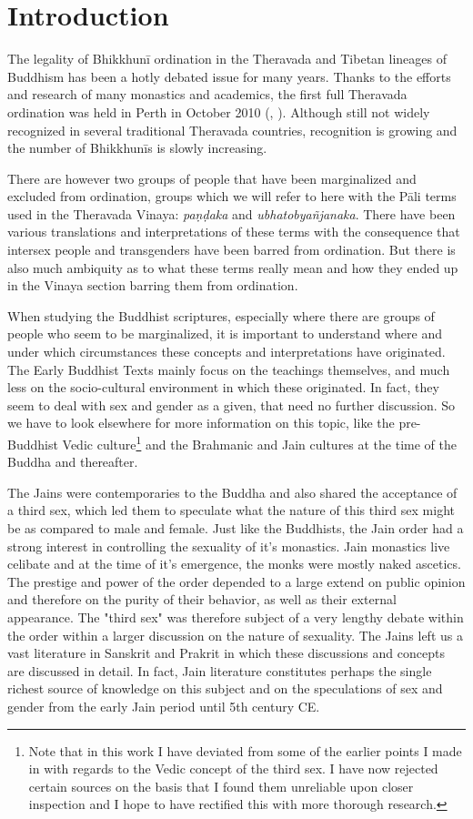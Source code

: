 \section{Introduction}
The legality of Bhikkhunī ordination in the Theravada and Tibetan lineages of Buddhism has been a hotly debated issue for many years. Thanks to the efforts and research of many monastics and academics, the first full Theravada ordination was held in Perth in October 2010 (\cite{sujato2009}, \cite{analayo2013}). Although still not widely recognized in several traditional Theravada countries, recognition is growing and the number of Bhikkhunīs is slowly increasing. 

There are however two groups of people that have been marginalized and excluded from ordination, groups which we will refer to here with the Pāli terms used in the Theravada Vinaya: {\em paṇḍaka} and {\em ubhatob­yañ­janaka}. There have been various translations and interpretations of these terms with the consequence that intersex people and transgenders have been barred from ordination. But there is also much ambiquity as to what these terms really mean and how they ended up in the Vinaya section barring them from ordination.

When studying the Buddhist scriptures, especially where there are groups of people who seem to be marginalized, it is important to understand where and under which circumstances these concepts and interpretations have originated. The Early Buddhist Texts mainly focus on the teachings themselves, and much less on the socio-cultural environment in which these originated. In fact, they seem to deal with sex and gender as a given, that need no further discussion. So we have to look elsewhere for more information on this topic, like the pre-Buddhist Vedic culture\footnote{Note that in this work I have deviated from some of the earlier points I made in \cite{vimala} with regards to the Vedic concept of the third sex. I have now rejected certain sources on the basis that I found them unreliable upon closer inspection and I hope to have rectified this with more thorough research.} and the Brahmanic and Jain cultures at the time of the Buddha and thereafter. 

The Jains were contemporaries to the Buddha and also shared the acceptance of a third sex, which led them to speculate what the nature of this third sex might be as compared to male and female. Just like the Buddhists, the Jain order had a strong interest in controlling the sexuality of it's monastics. Jain monastics live celibate and at the time of it's emergence, the monks were mostly naked ascetics. The prestige and power of the order depended to a large extend on public opinion and therefore on the purity of their behavior, as well as their external appearance. The "third sex" was therefore subject of a very lengthy debate within the order within a larger discussion on the nature of sexuality. The Jains left us a vast literature in Sanskrit and Prakrit in which these discussions and concepts are discussed in detail. In fact, Jain literature constitutes perhaps the single richest source of knowledge on this subject and on the speculations of sex and gender from the early Jain period until 5th century CE. 

